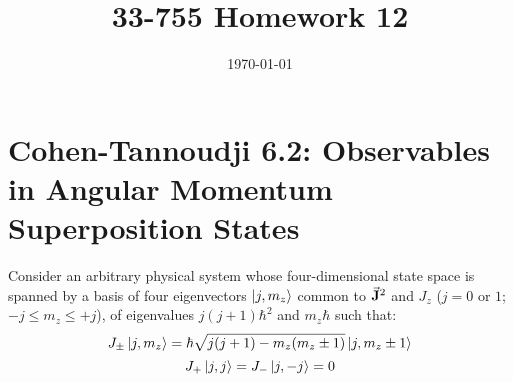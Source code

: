 \documentclass[a4paper,twoside]{article}
\title{33-755 Homework 12}
\date{\today}
\begin{document}
\maketitle

\section*{Cohen-Tannoudji 6.2: Observables in Angular Momentum Superposition States}
Consider an arbitrary physical system whose four-dimensional state space is spanned by a basis of four eigenvectors $\ket{j,m_z} $ common to $ \va{J}^2 $ and $ J_z $ ($ j = 0 $ or $ 1 $; $ -j \leq m_z \leq +j $), of eigenvalues $ j(j+1) \hbar^2 $ and $ m_z \hbar $ such that:
\begin{equation}
    J_{\pm}\ket{j, m_z} = \hbar \sqrt{j(j+1) - m_z (m_z \pm 1)}\ket{j, m_z \pm 1}
\end{equation}
\begin{equation}
    J_+\ket{j,j} = J_-\ket{j,-j} = 0
\end{equation}
\end{document}
